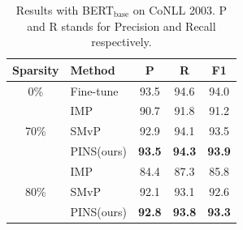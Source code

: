 \begin{table}[t]
	\centering
	\small
	\begin{tabular}{c|lccc}
		\toprule
		Sparsity              & Method     & P & R & F1   \\
		\midrule
		0\%                   & Fine-tune  & 93.5      & 94.6   & 94.0 \\
		\midrule
		\multirow{3}{*}{70\%} & IMP        & 90.7      & 91.8   & 91.2 \\
		& SMvP       & 92.9      & 94.1   & 93.5 \\
		& PINS(ours) & \textbf{93.5}      & \textbf{94.3}   & \textbf{93.9} \\
		\midrule
		\multirow{3}{*}{80\%} & IMP        & 84.4      & 87.3   & 85.8 \\
		& SMvP       & 92.1      & 93.1   & 92.6 \\
		& PINS(ours) & \textbf{92.8}      & \textbf{93.8}   & \textbf{93.3} \\
		\bottomrule
	\end{tabular}
	\caption{Results with BERT$_{\text{base}}$ on CoNLL 2003. P and R stands for Precision and Recall respectively.}
	\label{table:ner}
\end{table}

